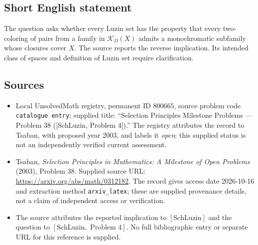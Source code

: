 \documentclass[11pt]{article}
\begin{document}
\subsection{Short English statement}
The question asks whether every Luzin set has the property that every two-coloring of pairs from a family in \(\mathcal K_\Omega(X)\) admits a monochromatic subfamily whose closures cover \(X\). The source reports the reverse implication. Its intended class of spaces and definition of Luzin set require clarification.
\subsection{Sources}
\begin{itemize}
\item Local UnsolvedMath registry, permanent ID \(800665\), source problem code \texttt{catalogue entry}; supplied title: ``Selection Principles Milestone Problems --- Problem 38 ([SchLuzin, Problem 4]).'' The registry attributes the record to Tsaban, with proposed year 2003, and labels it \emph{open}; this supplied status is not an independently verified current assessment.
\item Tsaban, \emph{Selection Principles in Mathematics: A Milestone of Open Problems} (2003), Problem 38. Supplied source URL: \url{https://arxiv.org/abs/math/0312182}. The record gives access date 2026-10-16 and extraction method \texttt{arxiv\_latex}; these are supplied provenance details, not a claim of independent access or verification.
\item The source attributes the reported implication to \([\mathrm{SchLuzin}]\) and the question to \([\mathrm{SchLuzin},\text{ Problem }4]\). No full bibliographic entry or separate URL for this reference is supplied.
\end{itemize}
\end{document}
